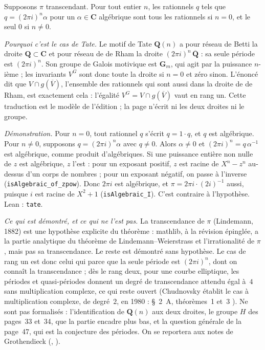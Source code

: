 \begin{enonce}
Supposons $\pi$ transcendant. Pour tout entier $n$, les rationnels $q$ tels que $q = (2\pi i)^n \alpha$ pour un $\alpha \in \mathbf C$ algébrique sont tous les rationnels si $n = 0$, et le seul $0$ si $n \neq 0$.
\end{enonce}
\emph{Pourquoi c'est le cas de Tate.} Le motif de Tate $\mathbf Q(n)$ a pour réseau de Betti la droite $\mathbf Q \subset \mathbf C$ et pour réseau de de Rham la droite $(2\pi i)^n\, \overline{\mathbf Q}$ : sa seule période est $(2\pi i)^n$. Son groupe de Galois motivique est $\mathbf G_m$, qui agit par la puissance $n$-ième ; les invariants $V^G$ sont donc toute la droite si $n = 0$ et zéro sinon. L'énoncé dit que $V \cap g(\overline V)$, l'ensemble des rationnels qui sont aussi dans la droite de de Rham, est exactement cela : l'égalité $V^G = V \cap g(\overline V)$ vaut en rang un. Cette traduction est le modèle de l'édition ; la page n'écrit ni les deux droites ni le groupe.

\emph{Démonstration.} Pour $n = 0$, tout rationnel $q$ s'écrit $q = 1 \cdot q$, et $q$ est algébrique. Pour $n \neq 0$, supposons $q = (2\pi i)^n \alpha$ avec $q \neq 0$. Alors $\alpha \neq 0$ et $(2\pi i)^n = q\,\alpha^{-1}$ est algébrique, comme produit d'algébriques. Si une puissance entière non nulle de $z$ est algébrique, $z$ l'est : pour un exposant positif, $z$ est racine de $X^n - z^n$ au-dessus d'un corps de nombres ; pour un exposant négatif, on passe à l'inverse (\texttt{isAlgebraic\_of\_zpow}). Donc $2\pi i$ est algébrique, et $\pi = 2\pi i \cdot (2i)^{-1}$ aussi, puisque $i$ est racine de $X^2 + 1$ (\texttt{isAlgebraic\_I}). C'est contraire à l'hypothèse. Lean : \texttt{tate}.

{\small\emph{Ce qui est démontré, et ce qui ne l'est pas.} La transcendance de $\pi$ (Lindemann, 1882) est une hypothèse explicite du théorème : mathlib, à la révision épinglée, a la partie analytique du théorème de Lindemann--Weierstrass et l'irrationalité de $\pi$, mais pas sa transcendance. Le reste est démontré sans hypothèse. Le cas de rang un est donc celui qui  parce que la seule période est $(2\pi i)^n$, dont on connaît la transcendance ; dès le rang deux, pour une courbe elliptique, les périodes et quasi-périodes donnent un degré de transcendance attendu égal à~$4$ sans multiplication complexe, ce qui reste ouvert (Chudnovsky établit le cas à multiplication complexe, de degré~$2$, en 1980 : §~2~A, théorèmes~1 et~3 \cite{chudnovsky1980}). Ne sont pas formalisés : l'identification de $\mathbf Q(n)$ aux deux droites, le groupe $H$ des pages~33 et~34, que la partie  encadre plus bas, et la question générale de la page~47, qui est la conjecture des périodes. On se reportera aux notes de Grothendieck (, ).\par}
